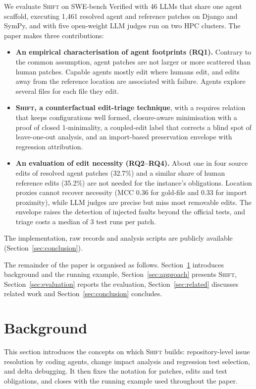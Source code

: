 \documentclass[a4paper,fleqn]{cas-sc}
\newcommand{\tool}{\textsc{Shift}}
\newcommand{\nValidPatches}{1{,}461}
\newcommand{\rqfourCallsMedian}{3}
\newcommand{\rqoneSystems}{46}
\newcommand{\rqtwoAgentSrcUnneeded}{32.7\%}
\newcommand{\rqtwoGoldSrcUnneeded}{35.2\%}
\newcommand{\rqtwoMccPdep}{0.33}
\newcommand{\rqtwoMccPgoldfile}{0.36}
\begin{document}
We evaluate \tool{} on SWE-bench Verified with \rqoneSystems{} LLMs that share one agent scaffold, executing \nValidPatches{} resolved agent and reference patches on Django and SymPy, and with five open-weight LLM judges run on two HPC clusters. The paper makes three contributions:
\begin{itemize}
\item \textbf{An empirical characterisation of agent footprints (RQ1).} Contrary to the common assumption, agent patches are not larger or more scattered than human patches. Capable agents mostly edit where humans edit, and edits away from the reference location are associated with failure. Agents explore several files for each file they edit.
\item \textbf{\tool{}, a counterfactual edit-triage technique}, with a requires relation that keeps configurations well formed, closure-aware minimisation with a proof of closed 1-minimality, a coupled-edit label that corrects a blind spot of leave-one-out analysis, and an import-based preservation envelope with regression attribution.
\item \textbf{An evaluation of edit necessity (RQ2--RQ4).} About one in four source edits of resolved agent patches (\rqtwoAgentSrcUnneeded{}) and a similar share of human reference edits (\rqtwoGoldSrcUnneeded{}) are not needed for the instance's obligations. Location proxies cannot recover necessity (MCC \rqtwoMccPgoldfile{} for gold-file and \rqtwoMccPdep{} for import proximity), while LLM judges are precise but miss most removable edits. The envelope raises the detection of injected faults beyond the official tests, and triage costs a median of \rqfourCallsMedian{} test runs per patch.
\end{itemize}
The implementation, raw records and analysis scripts are publicly available (Section~\ref{sec:conclusion}).

The remainder of the paper is organised as follows. Section~\ref{sec:background} introduces background and the running example, Section~\ref{sec:approach} presents \tool{}, Section~\ref{sec:evaluation} reports the evaluation, Section~\ref{sec:related} discusses related work and Section~\ref{sec:conclusion} concludes.


\section{Background}\label{sec:background}

This section introduces the concepts on which \tool{} builds: repository-level issue resolution by coding agents, change impact analysis and regression test selection, and delta debugging. It then fixes the notation for patches, edits and test obligations, and closes with the running example used throughout the paper.
\end{document}
